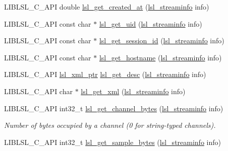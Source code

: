 \begin{DoxyCompactItemize}
\item 
L\+I\+B\+L\+S\+L\+\_\+\+C\+\_\+\+A\+PI double \hyperlink{namespacelsl_aded8755dc0f65d8219449ef37ba7f6c5}{lsl\+\_\+get\+\_\+created\+\_\+at} (\hyperlink{namespacelsl_aa0a9ce9956061679949daa2e35aae2e8}{lsl\+\_\+streaminfo} info)
\item 
L\+I\+B\+L\+S\+L\+\_\+\+C\+\_\+\+A\+PI const char $\ast$ \hyperlink{namespacelsl_a6e18a9b1c544932e96179a44bb1f31ec}{lsl\+\_\+get\+\_\+uid} (\hyperlink{namespacelsl_aa0a9ce9956061679949daa2e35aae2e8}{lsl\+\_\+streaminfo} info)
\item 
L\+I\+B\+L\+S\+L\+\_\+\+C\+\_\+\+A\+PI const char $\ast$ \hyperlink{namespacelsl_ae28332bda70380cfd546fc158cd6f009}{lsl\+\_\+get\+\_\+session\+\_\+id} (\hyperlink{namespacelsl_aa0a9ce9956061679949daa2e35aae2e8}{lsl\+\_\+streaminfo} info)
\item 
L\+I\+B\+L\+S\+L\+\_\+\+C\+\_\+\+A\+PI const char $\ast$ \hyperlink{namespacelsl_ab74235be779da7e0cdcfd59b498bdf3f}{lsl\+\_\+get\+\_\+hostname} (\hyperlink{namespacelsl_aa0a9ce9956061679949daa2e35aae2e8}{lsl\+\_\+streaminfo} info)
\item 
L\+I\+B\+L\+S\+L\+\_\+\+C\+\_\+\+A\+PI \hyperlink{namespacelsl_a5edc7a49a1a1be1634fe6dce3d59c59b}{lsl\+\_\+xml\+\_\+ptr} \hyperlink{namespacelsl_aeb428e46e46db8bd534e45ed8a76a120}{lsl\+\_\+get\+\_\+desc} (\hyperlink{namespacelsl_aa0a9ce9956061679949daa2e35aae2e8}{lsl\+\_\+streaminfo} info)
\item 
L\+I\+B\+L\+S\+L\+\_\+\+C\+\_\+\+A\+PI char $\ast$ \hyperlink{namespacelsl_ad1a9b14dccf565e5ecb79c093fe0fd39}{lsl\+\_\+get\+\_\+xml} (\hyperlink{namespacelsl_aa0a9ce9956061679949daa2e35aae2e8}{lsl\+\_\+streaminfo} info)
\item 
\mbox{\label{namespacelsl_aa11d6865aa57caf51f5d13c66a785b30}} 
L\+I\+B\+L\+S\+L\+\_\+\+C\+\_\+\+A\+PI int32\+\_\+t \hyperlink{namespacelsl_aa11d6865aa57caf51f5d13c66a785b30}{lsl\+\_\+get\+\_\+channel\+\_\+bytes} (\hyperlink{namespacelsl_aa0a9ce9956061679949daa2e35aae2e8}{lsl\+\_\+streaminfo} info)
\begin{DoxyCompactList}\small\item\em Number of bytes occupied by a channel (0 for string-\/typed channels). \end{DoxyCompactList}\item 
\mbox{\label{namespacelsl_a26e8a9f4b8c7ee128362aadbc688dab0}} 
L\+I\+B\+L\+S\+L\+\_\+\+C\+\_\+\+A\+PI int32\+\_\+t \hyperlink{namespacelsl_a26e8a9f4b8c7ee128362aadbc688dab0}{lsl\+\_\+get\+\_\+sample\+\_\+bytes} (\hyperlink{namespacelsl_aa0a9ce9956061679949daa2e35aae2e8}{lsl\+\_\+streaminfo} info)

\end{DoxyCompactItemize}
